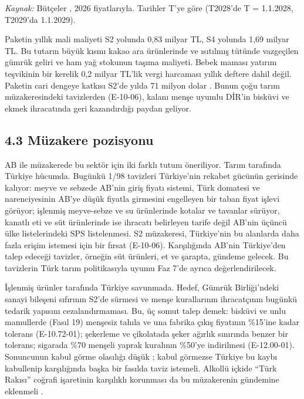 \emph{Kaynak:} Bütçeler \etiketT{}, 2026 fiyatlarıyla. Tarihler T'ye göre (T2028'de T = 1.1.2028, T2029'da 1.1.2029).

Paketin yıllık mali maliyeti S2 yolunda 0,83 milyar TL, S4 yolunda 1,69 milyar TL. Bu tutarın büyük kısmı kakao ara ürünlerinde ve ısıtılmış tütünde vazgeçilen gümrük geliri ve ham yağ stokunun taşıma maliyeti. Bebek maması yatırım teşvikinin bir kerelik 0,2 milyar TL'lik vergi harcaması yıllık deftere dahil değil. Paketin cari dengeye katkısı S2'de yılda 71 milyon dolar \etiketH{}. Bunun çoğu tarım müzakeresindeki tavizlerden (E-10-06), kalanı menşe uyumlu DİR'in bisküvi ve ekmek ihracatında geri kazandırdığı paydan geliyor.

\hypertarget{nace_kartlar_10-12-43-muxfczakere-pozisyonu}{%
\subsection{4.3 Müzakere pozisyonu}\label{nace_kartlar_10-12-43-muxfczakere-pozisyonu}}

AB ile müzakerede bu sektör için iki farklı tutum öneriliyor. Tarım tarafında Türkiye hücumda. Bugünkü 1/98 tavizleri Türkiye'nin rekabet gücünün gerisinde kalıyor: meyve ve sebzede AB'nin giriş fiyatı sistemi, Türk domatesi ve narenciyesinin AB'ye düşük fiyatla girmesini engelleyen bir taban fiyat işlevi görüyor; işlenmiş meyve-sebze ve su ürünlerinde kotalar ve tavanlar sürüyor, kanatlı eti ve süt ürünlerinde ise ihracatı belirleyen tarife değil AB'nin üçüncü ülke listelerindeki SPS listelenmesi. S2 müzakeresi, Türkiye'nin bu alanlarda daha fazla erişim istemesi için bir fırsat (E-10-06). Karşılığında AB'nin Türkiye'den talep edeceği tavizler, örneğin süt ürünleri, et ve şarapta, gündeme gelecek. Bu tavizlerin Türk tarım politikasıyla uyumu Faz 7'de ayrıca değerlendirilecek.

İşlenmiş ürünler tarafında Türkiye savunmada. Hedef, Gümrük Birliği'ndeki sanayi bileşeni sıfırının S2'de sürmesi ve menşe kurallarının ihracatçının bugünkü tedarik yapısını cezalandırmaması. Bu, üç somut talep demek: bisküvi ve unlu mamullerde (Fasıl 19) menşesiz tahıla ve una fabrika çıkış fiyatının \%15'ine kadar tolerans (E-10.72-01); şekerleme ve çikolatada şeker ağırlık sınırında benzer bir tolerans; sigarada \%70 menşeli yaprak kuralının \%50'ye indirilmesi (E-12.00-01). Sonuncunun kabul görme olasılığı düşük \etiketH{}; kabul görmezse Türkiye bu kaybı kabullenip karşılığında başka bir fasılda taviz istemeli. Alkollü içkide ``Türk Rakısı'' coğrafi işaretinin karşılıklı korunması da bu müzakerenin gündemine eklenmeli \etiketD{}.

